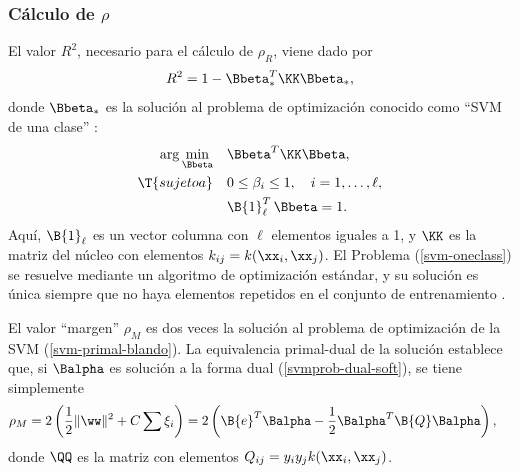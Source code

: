%
\subsubsection{Cálculo de $\rho$}
%
El valor $R^2$, necesario para el cálculo de $\rho_R$, viene dado por
%
\begin{align}
  R^2 = 1 - \Bbeta_*^T \KK \Bbeta_*,
\end{align}
%
donde $\Bbeta_*$ es la solución al problema de optimización conocido
como ``SVM de una clase'' \cite{scholkopf}:
%
\begin{align}
\begin{split}
  \arg\min_{\Bbeta}\quad&\Bbeta^T \KK \Bbeta,\\
  \T{sujeto a}    \quad&0\leq\beta_i\leq{}1,\quad{}i=1,\ldots,\ell,\\
                       &\B{1}^T_\ell\,\Bbeta=1.
  \end{split}
  \label{svm-oneclass}
\end{align}
%
Aquí, $\B{1}_{\ell}$ es un vector columna con $\ell$ elementos iguales
a 1, y $\KK$ es la matriz del núcleo con elementos
$k_{ij}=k(\xx_i,\xx_j)$. El Problema (\ref{svm-oneclass}) se resuelve
mediante un algoritmo de optimización estándar, y su solución es única
siempre que no haya elementos repetidos en el conjunto de entrenamiento
\cite{chung}.

El valor ``margen'' $\rho_M$ es dos veces la solución al problema de
optimización de la SVM (\autoref{svm-primal-blando}). La
equivalencia primal-dual de la solución establece que, si $\Balpha$ es solución a
la forma dual (\autoref{svmprob-dual-soft}), se tiene simplemente
%
\begin{align}
\label{prieqdual}
  \rho_M &= 2\left(\frac{1}{2}\|\ww\|^2+C\sum\xi_i \right)
  =2\left(\B{e}^T\Balpha-\frac{1}{2}\Balpha^T\B{Q}\Balpha\right),
\end{align}
%
donde $\QQ$ es la matriz con elementos $Q_{ij}=y_iy_jk(\xx_i,\xx_j)$.
